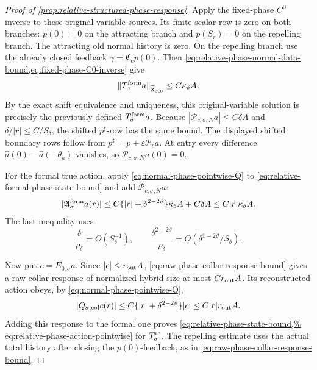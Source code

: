 \begin{proof}[Proof of
\cref{prop:relative-structured-phase-response}]
Apply the fixed-phase \(C^0\) inverse to these original-variable sources.
Its finite scalar row is zero on both branches:
\(p(0)=0\) on the attracting branch and \(p(S_r)=0\) on the repelling
branch.  The attracting old normal history is zero.  On the repelling
branch use the already closed feedback
\(\gamma=\mathfrak C_ep(0)\).  Then
\cref{eq:relative-phase-normal-data-bound,eq:fixed-phase-C0-inverse} give
\begin{equation}
 \|T_\sigma^{\rm form}a\|_{\widetilde{\mathsf X}_{\sigma,0}}
 \le C\kappa_\delta A.                            \label{eq:relative-formal-phase-state-bound}
\end{equation}
By the exact shift equivalence and uniqueness, this original-variable
solution is precisely the previously defined \(T_\sigma^{\rm form}a\).
Because
\(|\mathscr P_{c,\sigma,N}a|\le C\delta A\) and
\(\delta/|r|\le C/S_\delta\), the shifted \(p^\sharp\)-row has the same
bound.  The displayed shifted boundary rows follow from
\(p^\sharp=p+\varepsilon\mathscr P_c a\).  At entry every difference
\(\widehat a(0)-\widehat a(-\theta_k)\) vanishes, so
\(\mathscr P_{c,\sigma,N}a(0)=0\).

For the formal true action, apply
\cref{eq:normal-phase-pointwise-Q} to
\cref{eq:relative-formal-phase-state-bound} and add
\(\mathscr P_{c,\sigma,N}a\):
\begin{equation}
 |\mathfrak A_\sigma^{\rm form}a(r)|
 \le C\{|r|+\delta^{2-2\vartheta}\}\kappa_\delta A
       +C\delta A
 \le C|r|\kappa_\delta A.                         \label{eq:relative-formal-phase-action-pointwise}
\end{equation}
The last inequality uses
\[
 \frac{\delta}{\rho_\delta}=O(S_\delta^{-1}),\qquad
 \frac{\delta^{2-2\vartheta}}{\rho_\delta}
 =O(\delta^{1-2\vartheta}/S_\delta).
\]

Now put \(c=E_{0,\sigma}a\).  Since
\(|c|\le r_{\rm out}A\),
\cref{eq:raw-phase-collar-response-bound} gives a raw collar response of
normalized hybrid size at most \(Cr_{\rm out}A\).  Its reconstructed action obeys,
by \cref{eq:normal-phase-pointwise-Q},
\[
 |Q_{\sigma,\rm col}c(r)|
 \le C\{|r|+\delta^{2-2\vartheta}\}|c|
 \le C|r|r_{\rm out}A.
\]
Adding this response to the formal one proves
\cref{eq:relative-phase-state-bound,%
eq:relative-phase-action-pointwise} for \(T_\sigma^{\rm rc}\).
The repelling estimate uses the actual total history after closing the
\(p(0)\)-feedback, as in
\cref{eq:raw-phase-collar-response-bound}.


\end{proof}
